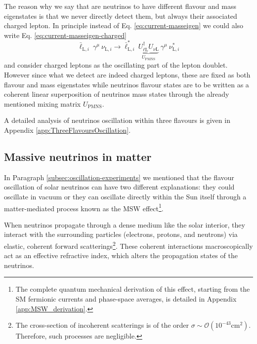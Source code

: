 The reason why we say that are neutrinos to have different flavour and mass eigenstates is that we never directly detect them,
but always their associated charged lepton. In principle instead of Eq. \ref{eq:current-masseigen} we could also write Eq. \ref{eq:current-masseigen-charged}
\begin{equation}
    \label{eq:current-masseigen-charged}
    \bar{\ell}_{\text{L}, i}~\gamma^{\mu}~\nu_{\text{L}, i} \longrightarrow \bar{\ell}_{\text{L}, i}^*~\underbrace{U_{\ell \text{L}}^\dagger U_{\nu \text{L}}}_{U_{\text{PMNS}}}~\gamma^{\mu}~\nu_{\text{L}, i}^* 
\end{equation} 
and consider charged leptons as the oscillating part of the lepton doublet. However since what we detect are indeed charged leptons, these are fixed as both flavour and mass eigenstates while neutrinos flavour states are to be written as a coherent linear superposition of neutrinos mass states through the already mentioned mixing matrix $U_\text{PMNS}$.

A detailed analysis of neutrinos oscillation within three flavours is given in Appendix \ref{app:ThreeFlavoursOscillation}.


\subsection[Massive neutrinos in matter]{Massive neutrinos in matter\footnotemark}
In Paragraph \ref{subsec:oscillation-experiments} we mentioned that the flavour oscillation of solar neutrinos can have two different explanations: they could oscillate in vacuum or they can oscillate directly within the Sun itself through a matter-mediated process known as the \ac{MSW} effect\footnote{The complete quantum mechanical derivation of this effect, starting from the \ac{SM} fermionic currents and phase-space averages, is detailed in Appendix \ref{app:MSW_derivation}.}.

When neutrinos propagate through a dense medium like the solar interior, they interact with the surrounding particles (electrons, protons, and neutrons) via elastic, coherent forward scatterings\footnote{The cross-section of incoherent scatterings is of the order $\sigma \sim \mathcal{O}(10^{-43}\text{cm}^2)$. Therefore, such processes are negligible.}. These coherent interactions macroscopically act as an effective refractive index, which alters the propagation states of the neutrinos.

